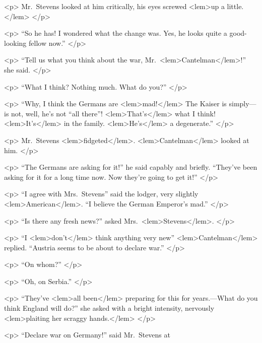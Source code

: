 {{				<p>
				Mr.\ Stevens looked at him critically, his eyes screwed 
<lem>up a little.</lem>{} 
 				</p> 

				<p>
				“So he has! I wondered what the change was. Yes, he looks quite a good-looking 
				fellow now.” 
 				</p> 

				<p>
				“Tell us what you think about the war, Mr.\ 
<lem>Cantelman</lem>{}!” she said. 
 				</p> 

				<p>
				“What I think? Nothing much. What do you?” 
 				</p> 

				<p>
				“Why, I think the Germans are 
<lem>mad!</lem>
					{} 
				The Kaiser is simply---is not, well, he's not 
				“all there”! 
<lem>That's</lem>
					{} 
				what I think! 
<lem>It's</lem>
					{} 
				in the family. 
<lem>He's</lem>
					{} 
				a degenerate.” 
 				</p> 

				<p>
				Mr.\ Stevens 
<lem>fidgeted</lem>{}. 
<lem>Cantelman</lem>{} looked at him. 
 				</p> 

				<p>
				“The Germans are asking for it!” he said capably and briefly. “They've been 
				asking for it for a long time now. Now they're going to get it!” 
 				</p> 

				<p>
				“I agree with Mrs.\ Stevens” said the lodger, very slightly 
<lem>American</lem>{\Afootnote{american}}. “I believe 
				the German Emperor's mad.” 
 				</p> 

				<p>
				“Is there any fresh news?” asked Mrs.\ 
<lem>Stevens</lem>{}. 
 				</p> 

				<p>
				“I 
<lem>don't</lem>
					{} 
				think anything very new” 
<lem>Cantelman</lem>{} replied. “Austria seems to be about 
				to declare war.” 
 				</p> 

				<p>
				“On whom?” 
 				</p> 

				<p>
				“Oh, on Serbia.” 
 				</p> 

				<p>
				“They've 
<lem>all been</lem>
					{} 
				preparing for this for years.---What do you think England will do?” 
				she asked with a bright intensity, nervously 
<lem>plaiting her scraggy hands.</lem>
					{} 
 				</p> 

				<p>
				“Declare war on Germany!” said Mr.\ Stevens at 
					{\Afootnote{once.}} 
				
}}
